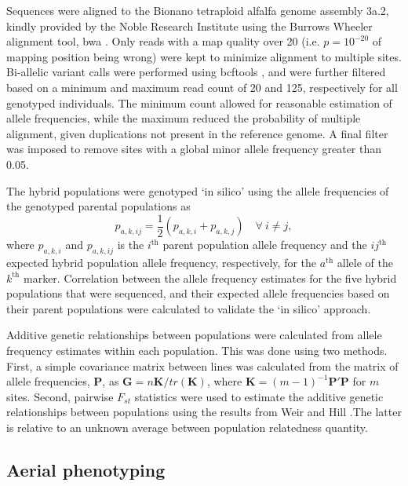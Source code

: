 \documentclass[12pt, letterpaper]{article}
\begin{document}
Sequences were aligned to the Bionano tetraploid alfalfa genome assembly 3a.2, kindly provided by the Noble Research Institute using the Burrows Wheeler alignment tool, bwa \parencite{li2009}. Only reads with a map quality over 20 (i.e. $p = 10^{-20}$ of mapping position being wrong) were kept to minimize alignment to multiple sites. Bi-allelic variant calls were performed using bcftools \parencite[SAMtools]{li2011}, and were further filtered based on a minimum and maximum read count of 20 and 125, respectively for all genotyped individuals. The minimum count allowed for reasonable estimation of allele frequencies, while the maximum reduced the probability of multiple alignment, given duplications not present in the reference genome. A final filter was imposed to remove sites with a global minor allele frequency greater than 0.05.

The hybrid populations were genotyped `in silico' using the allele frequencies of the genotyped parental populations as
\[p_{a,k,ij} = \frac{1}{2} (p_{a,k,i} + p_{a,k,j}) \quad \forall \ i \neq j,\]
\noindent where $p_{a,k,i}$ and $p_{a,k,ij}$ is the $i^\text{th}$ parent population allele frequency and the $ij^\text{th}$ expected hybrid population allele frequency, respectively, for the $a^\text{th}$ allele of the $k^\text{th}$ marker. Correlation between the allele frequency estimates for the five hybrid populations that were sequenced, and their expected allele frequencies based on their parent populations were calculated to validate the `in silico' approach.

Additive genetic relationships between populations were calculated from allele frequency estimates within each population. This was done using two methods. First, a simple covariance matrix between lines was calculated from the matrix of allele frequencies, $\mathbf{P}$, as $\mathbf{G} = n\mathbf{K} / tr(\mathbf{K})$, where $\mathbf{K} = (m-1)^{-1}\mathbf{P}'\mathbf{P}$ for $m$ sites. Second, pairwise $F_{st}$ statistics were used to estimate the additive genetic relationships between populations using the results from Weir and Hill \parencite*[][equation 7]{weir2002}.The latter is relative to an unknown average between population relatedness quantity. 



\subsection{Aerial phenotyping}
\end{document}

